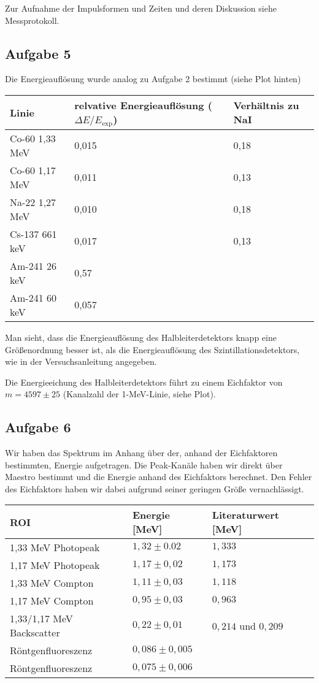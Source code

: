 \documentclass[a4paper,german,12pt,smallheadings]{scrartcl}
\begin{document}
Zur Aufnahme der Impulsformen und Zeiten und deren Diskussion siehe Messprotokoll.

\subsection{Aufgabe 5}

Die Energieauflösung wurde analog zu Aufgabe 2 bestimmt (siehe Plot hinten)

\begin{tabular}{l|l|l}
  Linie & relvative Energieauflösung ($\Delta E/E_\text{exp}$) & Verhältnis zu NaI \\
  \hline
  Co-60 1{,}33 MeV & 0{,}015 & 0{,}18\\
  Co-60 1{,}17 MeV & 0{,}011 & 0{,}13\\
  Na-22 1{,}27 MeV & 0{,}010 & 0{,}18\\
  Cs-137 661 keV & 0{,}017 & 0{,}13\\
  Am-241 26 keV & 0{,}57 \\
  Am-241 60 keV & 0{,}057
\end{tabular}
\vspace{22pt}

Man sieht, dass die Energieauflösung des Halbleiterdetektors knapp eine
Größenordnung besser ist, als die Energieauflösung des Szintillationsdetektors,
wie in der Versuchsanleitung angegeben.

Die Energieeichung des Halbleiterdetektors führt zu einem Eichfaktor von $m =
4597\pm25$ (Kanalzahl der 1-MeV-Linie, siehe Plot).


\subsection{Aufgabe 6}

Wir haben das Spektrum im Anhang über der, anhand der Eichfaktoren bestimmten,
Energie aufgetragen. Die Peak-Kanäle haben wir direkt über Maestro bestimmt und
die Energie anhand des Eichfaktors berechnet. Den Fehler des Eichfaktors haben
wir dabei aufgrund seiner geringen Größe vernachlässigt.

\begin{tabular}{l|l|l}
  ROI & Energie [MeV] & Literaturwert [MeV]\\
  \hline
  1{,}33 MeV Photopeak & $1,32\pm0.02$ & $1,333$\\
  1{,}17 MeV Photopeak & $1,17\pm0,02$ & $1,173$\\
  1{,}33 MeV Compton   & $1,11\pm0,03$ & $1,118$\\
  1{,}17 MeV Compton   & $0,95\pm0,03$ & $0,963$\\
  1{,}33/1{,}17 MeV Backscatter   & $0,22\pm0,01$ & $0,214$ und $0,209$\\
  Röntgenfluoreszenz   & $0,086\pm0,005$\\
  Röntgenfluoreszenz   & $0,075\pm0,006$
\end{tabular}
\vspace{22pt}
\end{document}
